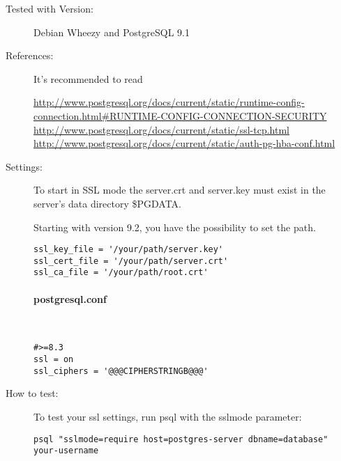 \begin{description}
\item[Tested with Version:] Debian Wheezy and PostgreSQL 9.1

\item[References:]

It's recommended to read 

{\small \url{http://www.postgresql.org/docs/current/static/runtime-config-connection.html#RUNTIME-CONFIG-CONNECTION-SECURITY}}
{\small \url{http://www.postgresql.org/docs/current/static/ssl-tcp.html}}
{\small \url{http://www.postgresql.org/docs/current/static/auth-pg-hba-conf.html}}

\item[Settings:] \mbox{}


To start in SSL mode the server.crt and server.key must exist in the server's data directory \$PGDATA. 

Starting with version 9.2, you have the possibility to set the path.

\begin{lstlisting}[breaklines]
ssl_key_file = '/your/path/server.key'
ssl_cert_file = '/your/path/server.crt'
ssl_ca_file = '/your/path/root.crt'
\end{lstlisting}

\paragraph*{postgresql.conf}\mbox{}\\

\begin{lstlisting}[breaklines]
#>=8.3
ssl = on 
ssl_ciphers = '@@@CIPHERSTRINGB@@@'
\end{lstlisting}



\item[How to test:]
To test your ssl settings, run psql with the sslmode parameter:
\begin{lstlisting}[breaklines]
psql "sslmode=require host=postgres-server dbname=database" your-username
\end{lstlisting}

\end{description}

